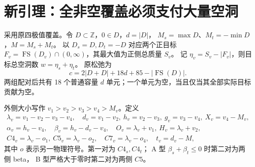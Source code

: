 \documentclass[11pt,a4paper]{article}
\newcommand{\FS}{\operatorname{FS}}
\newcommand{\Z}{\mathbb Z}
\begin{document}
\section{新引理：全非空覆盖必须支付大量空洞}\label{nonempty}
采用原四极值覆盖。令 $D\subset\Z$，$0\in D$，$d=|D|$，
$M_s=\max D$、$M_t=-\min D$，$M=M_s+M_t$。
以 $D_s=D,D_t=-D$ 对应两个正目标
$F_v=\FS(D_v)\cap(0,\infty)$，其最大值为正侧总质量 $S_v$。
记 $\eta_v=S_v-|F_v|$，则目标总空洞数 $w=\eta_s+\eta_t$。
原松弛为
\[c=2|D+D|+18d+85-|\FS(D)|.\]
两组配对后共有 18 个普通容量 $d$ 单元；一个单元为空，当且仅当其全部实际目标贡献为空。

外侧大小写作 $v_1>v_2>v_3>v_4>M_v$。定义
\[
\begin{gathered}
\lambda_v=v_1-v_2-v_3-v_4,\quad
d_v=v_1-v_2,\ h_v=v_2-v_3,\ g_v=v_3-v_4,\ X_v=v_4-M_v,\\
\alpha_v=h_v-v_4,\quad\beta_v=h_v-d_v-v_4,\quad
O_v=\lambda_v+v_1,\ H_v=\lambda_v+v_2,\\
C4_v=\lambda_v-o_1,\ C5_v=\lambda_v-o_2,\quad
C7_v=\lambda_v-o_4,\quad t_v=d_v-M,
\end{gathered}
\]
其中 $o$ 表示另一物理符号。第一对为 $C4_s,C4_t$；
A 型 $\beta_s+\beta_t\le0$ 时第二对为两侧 beta，
B 型严格大于零时第二对为两侧 $C5$。
\end{document}
